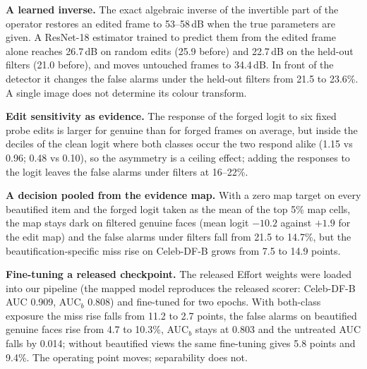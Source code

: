 \documentclass[10pt]{article}
\begin{document}
\textbf{A learned inverse.} The exact algebraic inverse of the invertible part of the operator restores an edited frame
to 53--58\,dB when the true parameters are given. A ResNet-18 estimator trained to predict them from the edited frame
alone reaches 26.7\,dB on random edits (25.9 before) and 22.7\,dB on the held-out filters (21.0 before), and moves
untouched frames to 34.4\,dB. In front of the detector it changes the false alarms under the held-out filters from 21.5
to 23.6\%. A single image does not determine its colour transform.

\textbf{Edit sensitivity as evidence.} The response of the forged logit to six fixed probe edits is larger for genuine
than for forged frames on average, but inside the deciles of the clean logit where both classes occur the two respond
alike (1.15 vs 0.96; 0.48 vs 0.10), so the asymmetry is a ceiling effect; adding the responses to the logit leaves the
false alarms under filters at 16--22\%.

\textbf{A decision pooled from the evidence map.} With a zero map target on every beautified item and the forged logit
taken as the mean of the top 5\% map cells, the map stays dark on filtered genuine faces (mean logit $-10.2$ against
$+1.9$ for the edit map) and the false alarms under filters fall from 21.5 to 14.7\%, but the beautification-specific
miss rise on Celeb-DF-B grows from 7.5 to 14.9 points.

\textbf{Fine-tuning a released checkpoint.} The released Effort weights were loaded into our pipeline (the mapped
model reproduces the released scorer: Celeb-DF-B AUC 0.909, AUC$_b$ 0.808) and fine-tuned for two epochs. With both-class
exposure the miss rise falls from 11.2 to 2.7 points, the false alarms on beautified genuine faces rise from 4.7 to
10.3\%, AUC$_b$ stays at 0.803 and the untreated AUC falls by 0.014; without beautified views the same fine-tuning gives
5.8 points and 9.4\%. The operating point moves; separability does not.
\end{document}
